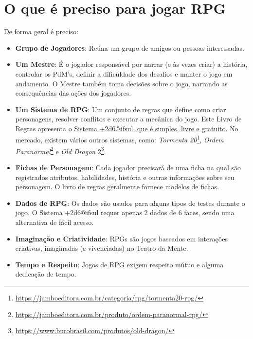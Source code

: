 \section{\label{sec:necessario}O que é preciso para jogar RPG}
De forma geral é preciso:
\begin{itemize}
	\item \textbf{Grupo de Jogadores}: Reúna um grupo de amigos ou pessoas interessadas.
	\item \textbf{Um Mestre}: É o jogador responsável por narrar (e às vezes criar) a história, controlar os PdM's, definir a dificuldade dos desafios e manter o jogo em andamento. O Mestre também toma decisões sobre o jogo, narrando as consequências das ações dos jogadores.
	\item \textbf{Um Sistema de RPG}: Um conjunto de regras que define como criar personagens, resolver conflitos e executar a mecânica do jogo. Este Livro de Regras apresenta o \underline{Sistema +2d6@ifsul, que é simples, livre e gratuito}. 	
	No mercado, existem vários outros sistemas, como: \emph{Tormenta 20}\footnote{\url{https://jamboeditora.com.br/categoria/rpg/tormenta20-rpg/}}, \emph{Ordem Paranormal}\footnote{\url{https://jamboeditora.com.br/produto/ordem-paranormal-rpg/}} e \emph{Old Dragon} 2\footnote{\url{https://www.burobrasil.com/produtos/old-dragon/}}. 
	\item \textbf{Fichas de Personagem}: Cada jogador precisará de uma ficha na qual são registrados atributos, habilidades, história e outras informações sobre seu personagem. O livro de regras geralmente fornece modelos de fichas.
	\item \textbf{Dados de RPG}: Os dados são usados para alguns tipos de testes durante o jogo. O Sistema +2d6@ifsul requer apenas 2 dados de 6 faces, sendo uma alternativa de fácil acesso.
	\item \textbf{Imaginação e Criatividade}: RPGs são jogos baseados em interações criativas, imaginadas (e vivenciadas) no Teatro da Mente.
	\item \textbf{Tempo e Respeito}: Jogos de RPG exigem respeito mútuo e alguma dedicação de tempo.
\end{itemize}

